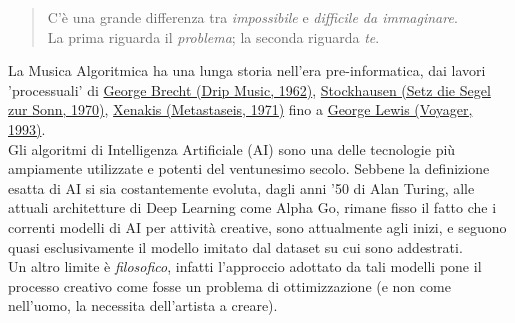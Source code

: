 \documentclass[a4paper,12pt]{report}
\begin{document}
\begin{quote}
\centering

C’è una grande differenza tra \textit{impossibile} e \textit{difficile da immaginare}. \\
La prima riguarda il \textit{problema}; la seconda riguarda \textit{te}.

\end{quote}

La Musica Algoritmica ha una lunga storia nell'era pre-informatica, dai lavori 'processuali' di \href{https://youtu.be/UT5lgaE-qZY}{George Brecht (Drip Music, 1962)}, \href{https://youtu.be/pxs35GrZVAs}{Stockhausen (Setz die Segel zur Sonn, 1970)}, \href{https://youtu.be/SZazYFchLRI}{Xenakis (Metastaseis, 1971)} fino a \href{https://youtu.be/o9UsLbsdA6s}{George Lewis (Voyager, 1993)}. \\

Gli algoritmi di Intelligenza Artificiale (AI) sono una delle tecnologie più ampiamente utilizzate e potenti del ventunesimo secolo. Sebbene la definizione esatta di AI si sia costantemente evoluta, dagli anni '50 di Alan Turing, alle attuali architetture di Deep Learning come Alpha Go, 
rimane fisso il fatto che i correnti modelli di AI per attività creative, sono attualmente agli inizi, e seguono quasi esclusivamente il modello imitato dal dataset su cui sono addestrati. \\
Un altro limite è \textit{filosofico}, infatti l'approccio adottato da tali modelli pone il processo creativo come fosse un problema di ottimizzazione (e non come nell'uomo, la necessita dell'artista a creare). \\ 
\end{document}
